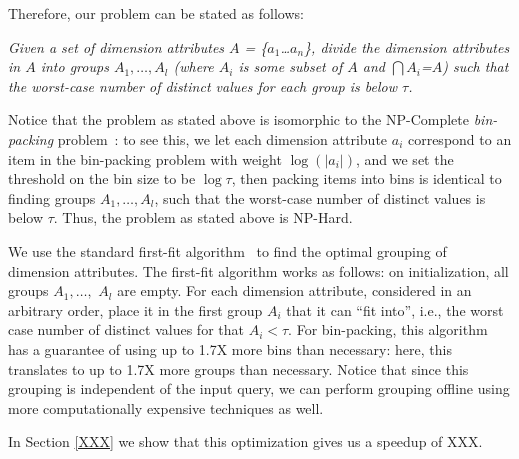 Therefore, our problem can be stated as follows:
\begin{problem}
{\em Given a set of dimension attributes $A$ = \{$a_1$\ldots$a_n$\}, divide the
dimension attributes in $A$ into groups $A_1, \ldots, A_l$ (where $A_i$ is some
subset of $A$ and $\bigcap A_i$=$A$) such that the worst-case number of distinct values
for each group is below $\tau$.}
\end{problem}
Notice that the problem as stated above is isomorphic to the NP-Complete
{\em bin-packing} problem~\cite{garey}: to see this, we let each dimension attribute
$a_i$ correspond to an item in the bin-packing problem with weight $\log (|a_i|)$,
and we set the threshold on the bin size to be $\log \tau$,
then packing items into bins is identical to finding groups $A_1, \ldots, A_l$,
such that the worst-case number of distinct values is below $\tau$.
Thus, the problem as stated above is NP-Hard.

We use the standard first-fit algorithm~\cite{first-fit} to find the optimal
grouping of dimension attributes.
The first-fit algorithm works as follows:
on initialization, all groups $A_1, \ldots, $ $A_l$ are empty.
  For each dimension attribute, considered in an arbitrary order, place it in the first group
  $A_i$ that it can ``fit into'', i.e., the worst case
  number of distinct values for that $A_i < \tau$.
  For bin-packing, this algorithm has a guarantee of using up to 1.7X more 
  bins than necessary: here, this translates to up to 1.7X more groups than necessary.
Notice that since this grouping is independent of the input query, we can
perform grouping offline using more computationally expensive techniques as
well.

In Section \ref{XXX} we show that this optimization gives us a speedup of XXX.

  
